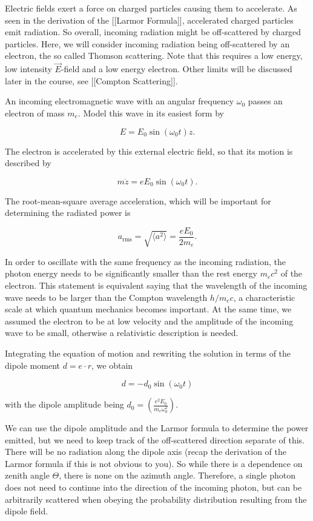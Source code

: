 \documentclass{article}
\begin{document}
Electric fields exert a force on charged particles causing them to accelerate. As seen in the derivation of the [[Larmor Formula]], accelerated charged particles emit radiation. So overall, incoming radiation might be off-scattered by charged particles. Here, we will consider incoming radiation being off-scattered by an electron, the so called Thomson scattering. Note that this requires a low energy, low intensity $\vec{E}$-field and a low energy electron. Other limits will be discussed later in the course, see [[Compton Scattering]].

An incoming electromagnetic wave with an angular frequency $\omega_0$ passes an electron of mass $m_e$. Model this wave in its easiest form by

$$E=E_0 \sin(\omega_0 t)\hat{z}.$$

The electron is accelerated by this external electric field, so that its motion is described by

$$m\ddot{z}=eE_0 \sin(\omega_0 t).$$

The root-mean-square average acceleration, which will be important for determining the radiated power is

$$a_\text{rms}=\sqrt{\langle a^2 \rangle} = \frac{eE_0}{2m_e}.$$


In order to oscillate with the same frequency as the incoming radiation, the photon energy needs to be significantly smaller than the rest energy $m_e c^2$ of the electron. This statement is equivalent saying that the wavelength of the incoming wave needs to be larger than the Compton wavelength $h/m_ec$, a characteristic scale at which quantum mechanics becomes important. At the same time, we assumed the electron to be at low velocity and the amplitude of the incoming wave to be small, otherwise a relativistic description is needed.


Integrating the equation of motion and rewriting the solution in terms of the dipole moment $d=e \cdot r$, we obtain

$$d=-d_0\sin(\omega_0 t)$$

with the dipole amplitude being $d_0=\left(\frac{e^2 E_0}{m_e\omega_0^2}\right)$.

We can use the dipole amplitude and the Larmor formula to determine the power emitted, but we need to keep track of the off-scattered direction separate of this. There will be no radiation along the dipole axis (recap the derivation of the Larmor formula if this is not obvious to you). So while there is a dependence on zenith angle $\Theta$, there is none on the azimuth angle. Therefore, a single photon does not need to continue into the direction of the incoming photon, but can be arbitrarily scattered when obeying the probability distribution resulting from the dipole field.
\end{document}
